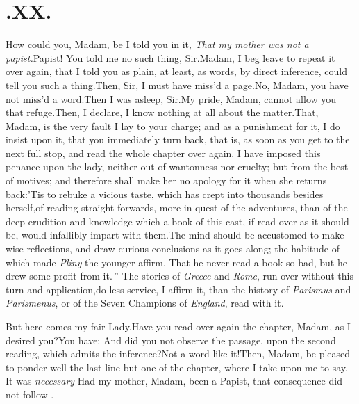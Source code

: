 \documentclass{article}
\begin{document}
\vskip 48pt
\newpage\null\kern-12pt
\section{.\enspace XX.}

\qquad\tsh How could you, Madam, be\break
{}
I told you in it, \textit{That my mother was not a
papist.}\tsh  Papist! You told me no such thing,
Sir.\tsk  Madam, I beg leave to repeat it over again, that I told
you as plain, at least, as words, by direct inference, could tell
you such a thing.\tsk  Then, Sir, I must have miss’d a
page.\tsk  No, Madam, you have not miss’d a word.\tsk  Then
I was asleep, Sir.\tsk  My pride, Madam, cannot allow you that
refuge.\tsk  Then, I declare, I know nothing at all about the
matter.\tsk  That, Madam, is the very fault I lay to your charge;
and as a punishment for it, I do insist upon it, that you
immediately turn back, that is, as soon as you get to the next full
stop, and read the whole chapter over again. I have imposed this
penance upon the lady, neither out of wantonness nor cruelty; but
from the best of motives; and therefore shall make her no apology
for it when she returns back:\tsk  ’Tis to rebuke a vicious
taste, which has crept into thousands besides herself,\tsk  of
reading straight forwards, more in quest of the adventures, than of the deep erudition
and knowledge which a book of this cast, if read over as it should
be, would infallibly impart with them.\tsh  The mind should
be accustomed to make wise reflections, and draw curious
conclusions as it goes along; the habitude of which made
\textit{Pliny} the younger affirm, \lqq That he never read a
book so bad, but he drew some profit from it.\,” The stories of
\textit{Greece} and \textit{Rome}, run over without this turn and
application,\tsk  do less service, I affirm it, than the history
of \textit{Parismus} and \textit{Parismenus}, or of the Seven Champions
of \textit{England}, read with it.

\tsh  But here comes my fair Lady.\break Have you read over again the
chapter, Madam, as I desired you?\tsk  You have: And did you not observe the
passage, upon the second reading, which admits the inference?\tsk  Not a word
like it!\break Then, Madam, be pleased to ponder well the last line but one of the
chapter, where I take upon me to say, \lqq It was \textit{necessary}
Had my mother, Madam, been a
Papist, that consequence did not follow \fnast.\\
\end{document}
